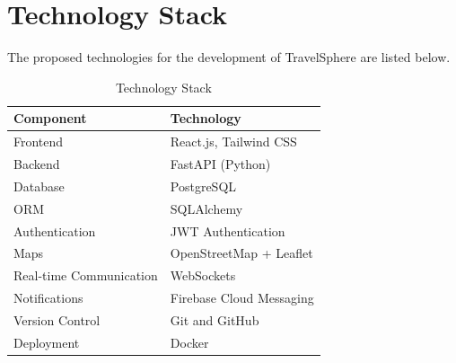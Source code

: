 \documentclass[12pt,a4paper]{article}
\begin{document}
\section{Technology Stack}

The proposed technologies for the development of TravelSphere are listed below.

\begin{table}[h]

\centering

\renewcommand{\arraystretch}{1.4}

\begin{tabular}{|p{5cm}|p{8cm}|}

\hline

\textbf{Component} & \textbf{Technology} \\

\hline

Frontend & React.js, Tailwind CSS \\

\hline

Backend & FastAPI (Python) \\

\hline

Database & PostgreSQL \\

\hline

ORM & SQLAlchemy \\

\hline

Authentication & JWT Authentication \\

\hline

Maps & OpenStreetMap + Leaflet \\

\hline

Real-time Communication & WebSockets \\

\hline

Notifications & Firebase Cloud Messaging \\

\hline

Version Control & Git and GitHub \\

\hline

Deployment & Docker \\

\hline

\end{tabular}

\caption{Technology Stack}

\end{table}
\end{document}

